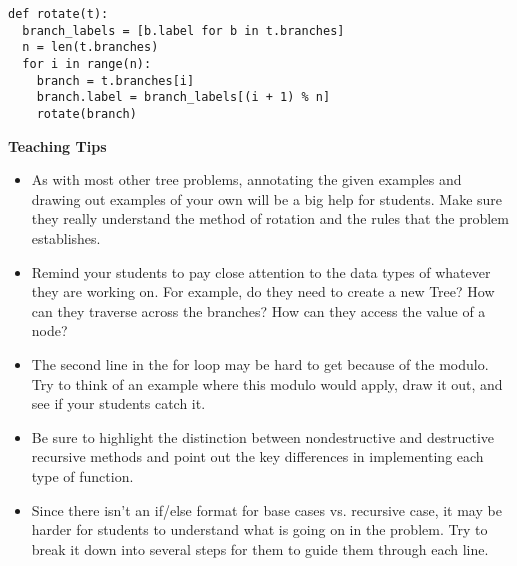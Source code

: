 \begin{blocksection}
\begin{solution}
\begin{lstlisting}
def rotate(t):
  branch_labels = [b.label for b in t.branches]
  n = len(t.branches)
  for i in range(n):
    branch = t.branches[i]
    branch.label = branch_labels[(i + 1) % n]
    rotate(branch)
\end{lstlisting}
\end{solution}
\end{blocksection}

\begin{blocksection}
\begin{guide}
\textbf{Teaching Tips}
\begin{itemize}
	\item As with most other tree problems, annotating the given examples and drawing out examples of your own will be a big help for students. Make sure they really understand the method of rotation and the rules that the problem establishes.
	\item Remind your students to pay close attention to the data types of whatever they are working on. For example, do they need to create a new Tree? How can they traverse across the branches? How can they access the value of a node?
	\item The second line in the for loop may be hard to get because of the modulo. Try to think of an example where this modulo would apply, draw it out, and see if your students catch it.
	\item Be sure to highlight the distinction between nondestructive and destructive recursive methods and point out the key differences in implementing each type of function.
	\item Since there isn't an if/else format for base cases vs. recursive case, it may be harder for students to understand what is going on in the problem. Try to break it down into several steps for them to guide them through each line.
\end{itemize}
\end{guide}
\end{blocksection}